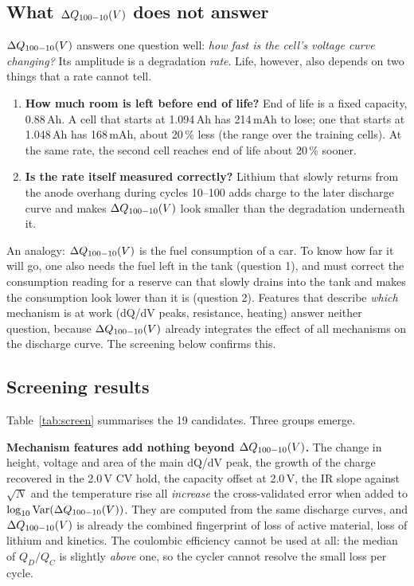 \subsection{What $\Delta Q_{100-10}(V)$ does not answer}
$\Delta Q_{100-10}(V)$ answers one question well: \emph{how fast is the cell's voltage
curve changing?} Its amplitude is a degradation \emph{rate}. Life, however,
also depends on two things that a rate cannot tell.
\begin{enumerate}
  \item \textbf{How much room is left before end of life?} End of life is a
  fixed capacity, 0.88\,Ah. A cell that starts at 1.094\,Ah has 214\,mAh to
  lose; one that starts at 1.048\,Ah has 168\,mAh, about 20\,\% less (the
  range over the training cells). At the same rate, the second cell reaches
  end of life about 20\,\% sooner.
  \item \textbf{Is the rate itself measured correctly?} Lithium that slowly
  returns from the anode overhang during cycles 10--100 adds charge to the
  later discharge curve and makes $\Delta Q_{100-10}(V)$ look smaller than the degradation
  underneath it.
\end{enumerate}
An analogy: $\Delta Q_{100-10}(V)$ is the fuel consumption of a car. To know how far it will
go, one also needs the fuel left in the tank (question 1), and must correct
the consumption reading for a reserve can that slowly drains into the tank
and makes the consumption look lower than it is (question 2). Features that
describe \emph{which} mechanism is at work (dQ/dV peaks, resistance,
heating) answer neither question, because $\Delta Q_{100-10}(V)$ already integrates the
effect of all mechanisms on the discharge curve. The screening below
confirms this.

\subsection{Screening results}
\label{sec:screen}
Table~\ref{tab:screen} summarises the 19 candidates. Three groups emerge.

\textbf{Mechanism features add nothing beyond $\Delta Q_{100-10}(V)$.} The change in height,
voltage and area of the main dQ/dV peak, the growth of the charge recovered
in the 2.0\,V CV hold, the capacity offset at 2.0\,V, the IR slope against
$\sqrt{N}$ and the temperature rise all \emph{increase} the
cross-validated error when added to $\log_{10}\mathrm{Var}(\Delta Q_{100-10}(V))$. They are
computed from the same discharge curves, and $\Delta Q_{100-10}(V)$ is already the combined
fingerprint of loss of active material, loss of lithium and kinetics. The
coulombic efficiency cannot be used at all: the median of $Q_D/Q_C$ is
slightly \emph{above} one, so the cycler cannot resolve the small loss per
cycle.

